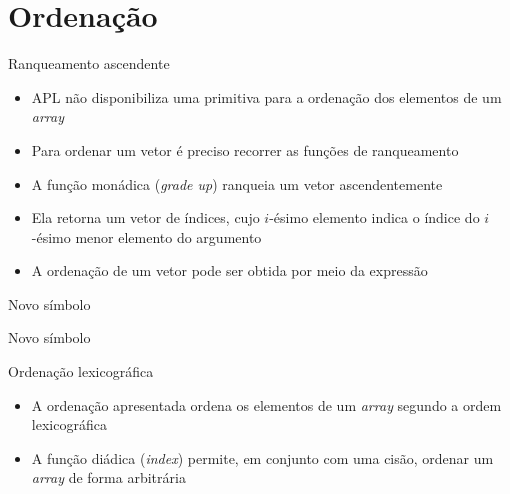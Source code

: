 \section{Ordenação}

\begin{frame}[fragile]{Ranqueamento ascendente}

    \begin{itemize}
        \item APL não disponibiliza uma primitiva para a ordenação dos elementos de um
            \textit{array}
        \pause

        \item Para ordenar um vetor é preciso recorrer as funções de ranqueamento
        \pause

        \item A função monádica  (\textit{grade up}) ranqueia um vetor
            ascendentemente
        \pause

        \item Ela retorna um vetor de índices, cujo $i$-ésimo elemento indica
            o índice do $i$-ésimo menor elemento do argumento
        \pause

        \item A ordenação de um vetor pode ser obtida por meio da expressão 
    \end{itemize}

\end{frame}

\begin{frame}[fragile]{Novo símbolo}


\end{frame}

\begin{frame}[fragile]{Novo símbolo}


\end{frame}

\begin{frame}[fragile]{Ordenação lexicográfica}

    \begin{itemize}
        \item A ordenação apresentada ordena os elementos de um \textit{array} segundo a ordem
            lexicográfica
        \pause

        \item A função diádica  (\textit{index}) permite, em conjunto com uma cisão,
            ordenar um \textit{array} de forma arbitrária
    \end{itemize}

\end{frame}

